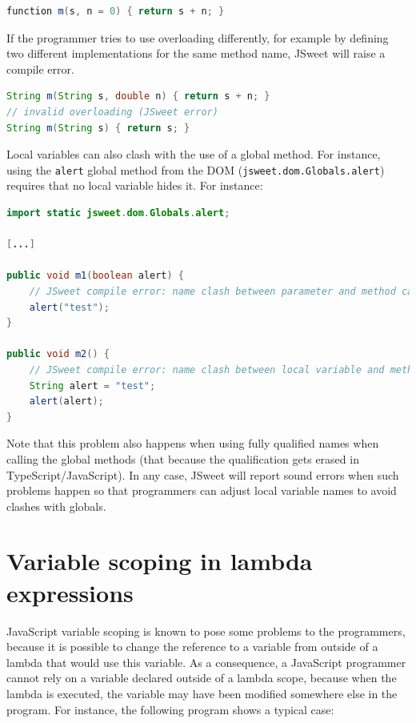 \documentclass[a4paper]{report}
\begin{document}
\begin{lstlisting}[language=Java]
function m(s, n = 0) { return s + n; }
\end{lstlisting}


If the programmer tries to use overloading differently, for example by defining two different implementations for the same method name, JSweet will raise a compile error. 

\begin{lstlisting}[language=Java]
String m(String s, double n) { return s + n; }
// invalid overloading (JSweet error)
String m(String s) { return s; }
\end{lstlisting}

Local variables can also clash with the use of a global method. For instance, using the \texttt{alert} global method from the DOM (\texttt{jsweet.dom.Globals.alert}) requires that no local variable hides it. For instance:

\begin{lstlisting}[language=Java]
import static jsweet.dom.Globals.alert;

[...]

public void m1(boolean alert) {
	// JSweet compile error: name clash between parameter and method call
	alert("test");
}

public void m2() {
	// JSweet compile error: name clash between local variable and method call
	String alert = "test";
	alert(alert);
}
\end{lstlisting}

Note that this problem also happens when using fully qualified names when calling the global methods (that because the qualification gets erased in TypeScript/JavaScript). In any case, JSweet will report sound errors when such problems happen so that programmers can adjust local variable names to avoid clashes with globals.

\section{Variable scoping in lambda expressions}

JavaScript variable scoping is known to pose some problems to the programmers, because it is possible to change the reference to a variable from outside of a lambda that would use this variable. As a consequence, a JavaScript programmer cannot rely on a variable declared outside of a lambda scope, because when the lambda is executed, the variable may have been modified somewhere else in the program. For instance, the following program shows a typical case: 
\end{document}

